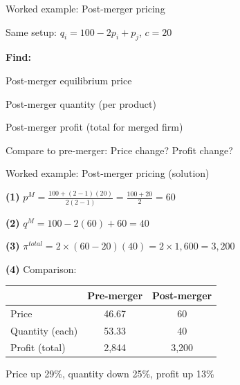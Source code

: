 \documentclass[notes,11pt, aspectratio=169]{beamer}
\newenvironment{wideitemize}{\itemize\addtolength{\itemsep}{10pt}}{\enditemize}
\newenvironment{wideenumerate}{\enumerate\addtolength{\itemsep}{10pt}}{\endenumerate}
\begin{document}
\begin{frame}{Worked example: Post-merger pricing}
	\begin{wideitemize}
		\item Same setup: $q_i = 100 - 2p_i + p_j$, $c = 20$
		\item \textbf{Find:}
		\begin{wideenumerate}
			\item Post-merger equilibrium price
			\item Post-merger quantity (per product)
			\item Post-merger profit (total for merged firm)
			\item Compare to pre-merger: Price change? Profit change?
		\end{wideenumerate}
	\end{wideitemize}
\end{frame}

\begin{frame}{Worked example: Post-merger pricing (solution)}
	\begin{wideitemize}
		\item \textbf{(1)} $p^M = \frac{100 + (2-1)(20)}{2(2-1)} = \frac{100 + 20}{2} = 60$
		\item \textbf{(2)} $q^M = 100 - 2(60) + 60 = 40$
		\item \textbf{(3)} $\pi^{total} = 2 \times (60 - 20)(40) = 2 \times 1,600 = 3,200$
		\item \textbf{(4)} Comparison:
		\begin{center}
			\begin{tabular}{|l|c|c|}
				\hline
				& Pre-merger & Post-merger \\
				\hline
				Price & 46.67 & 60 \\
				Quantity (each) & 53.33 & 40 \\
				Profit (total) & 2,844 & 3,200 \\
				\hline
			\end{tabular}
		\end{center}
		\item Price up 29\%, quantity down 25\%, profit up 13\%
	\end{wideitemize}
\end{frame}
\end{document}
